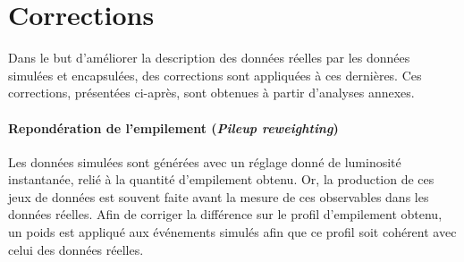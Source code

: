 \section{Corrections}\label{chapter-HTT_analysis-section-corrections}
Dans le but d'améliorer la description des données réelles par les données simulées et encapsulées, des corrections sont appliquées à ces dernières.
Ces corrections, présentées ci-après, sont obtenues à partir d'analyses annexes.
\paragraph{Repondération de l'empilement (\emph{Pileup reweighting})}
Les données simulées sont générées avec un réglage donné de luminosité instantanée, relié à la quantité d'empilement obtenu.
Or, la production de ces jeux de données est souvent faite avant la mesure de ces observables dans les données réelles.
Afin de corriger la différence sur le profil d'empilement obtenu, un poids est appliqué aux événements simulés afin que ce profil soit cohérent avec celui des données réelles.
